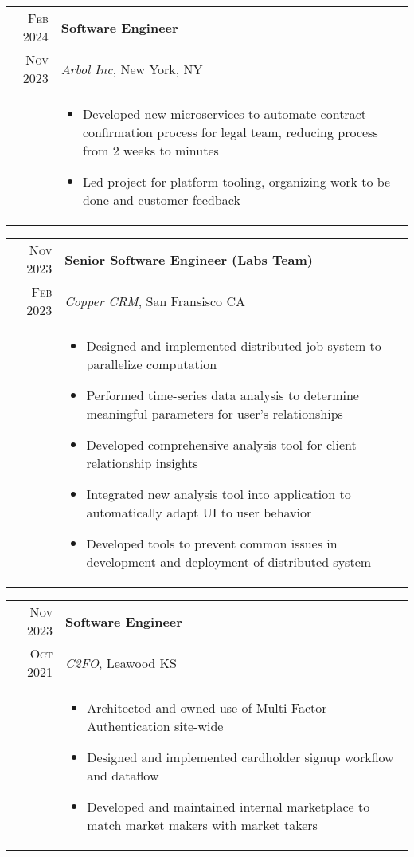 \documentclass[a4paper,10pt]{article}
\begin{document}
\begin{tabular}{r|p{15cm}}
  \textsc{Feb 2024}  & \textbf{Software Engineer} \\
  \textsc{Nov 2023} & \textit{Arbol Inc}, New York, NY
  \\ &  
       \begin{itemize}
       \item Developed new microservices to automate contract confirmation process for legal team, reducing
             process from 2 weeks to minutes
       \item Led project for platform tooling, organizing work to be done and customer feedback
       \end{itemize} \\
\end{tabular}

\begin{tabular}{r|p{15cm}}
  \textsc{Nov 2023}  & \textbf{Senior Software Engineer (Labs Team)} \\
  \textsc{Feb 2023} & \textit{Copper CRM}, San Fransisco CA
  \\ &  
       \begin{itemize}
       \item Designed and implemented distributed job system to parallelize computation
       \item Performed time-series data analysis to determine meaningful parameters for user’s relationships
       \item Developed comprehensive analysis tool for client relationship insights
       \item Integrated new analysis tool into application to automatically adapt UI to user behavior
       \item Developed tools to prevent common issues in development and deployment of distributed system
       \end{itemize} \\
\end{tabular}

\begin{tabular}{r|p{15cm}}
  \textsc{Nov 2023} & \textbf{Software Engineer} \\
  \textsc{Oct 2021} & \textit{C2FO}, Leawood KS
  \\ &  
       \begin{itemize}
       \item Architected and owned use of Multi-Factor Authentication site-wide
       \item Designed and implemented cardholder signup workflow and dataflow
       \item Developed and maintained internal marketplace to match market makers with market takers
       \end{itemize} \\
\end{tabular}
\end{document}
